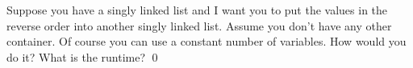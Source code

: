 \begin{ex}
Suppose you have a singly linked list and I want you
to put the values in the reverse order into another
singly linked list.
Assume you don't have any other container.
Of course you can use a constant number of variables.
How would you do it?
What is the runtime?
\qed
\end{ex}

